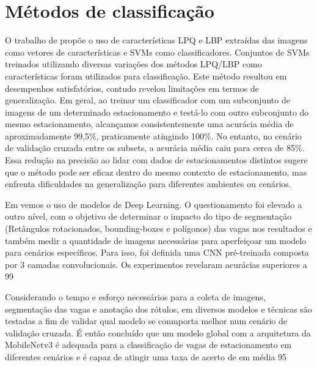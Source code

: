 \section{Métodos de classificação}

O trabalho de \citet{pklot2} propõe o uso de características LPQ e LBP extraídas das imagens como vetores de características e SVMs como classificadores. Conjuntos de SVMs treinados utilizando diversas variações dos métodos LPQ/LBP como características foram utilizados para classificação. Este método resultou em desempenhos satisfatórios, contudo revelou limitações em termos de generalização. Em geral, ao treinar um classificador com um subconjunto de imagens de um determinado estacionamento e testá-lo com outro subconjunto do mesmo estacionamento, alcançamos consistentemente uma acurácia média de aproximadamente 99,5\%, praticamente atingindo 100\%. No entanto, no cenário de validação cruzada entre os subsets, a acurácia média caiu para cerca de 85\%. Essa redução na precisão ao lidar com dados de estacionamentos distintos sugere que o método pode ser eficaz dentro do mesmo contexto de estacionamento, mas enfrenta dificuldades na generalização para diferentes ambientes ou cenários.

Em \citet{hochuli-1} vemos o uso de modelos de Deep Learning. O questionamento foi elevado a outro nível, com o objetivo de determinar o impacto do tipo de segmentação (Retângulos rotacionados, bounding-boxes e polígonos) das vagas nos resultados e também medir a quantidade de imagens necessárias para aperfeiçoar um modelo para cenários específicos. Para isso, foi definida uma CNN pré-treinada composta por 3 camadas convolucionais. Os experimentos revelaram acurácias superiores a 99%

Considerando o tempo e esforço necessários para a coleta de imagens, segmentação das vagas e anotação dos rótulos, em \citet{hochuli-2} diversos modelos e técnicas são testadas a fim de validar qual modelo se conmporta melhor num cenário de validação cruzada. É então concluído que um modelo global com a arquitetura da MobileNetv3 \citep{MobileNetV3} é adequada para a classificação de vagas de estacionamento em diferentes cenários e é capaz de atingir uma taxa de acerto de em média 95%

